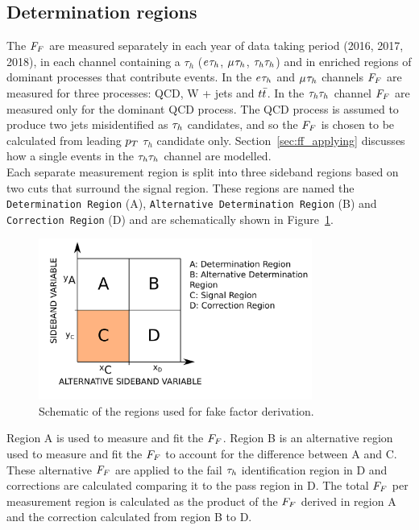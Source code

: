 \subsection{Determination regions}
\label{sec:ff_dr}

The $F_{F}$ are measured separately in each year of data taking period (2016, 2017, 2018), in each channel containing a $\tau_h$ ($e_{}\tau_{h}$, $\mu_{}\tau_{h}$, $\tau_{h}\tau_{h}$) and in enriched regions of dominant processes that contribute \jtth events.
In the $e_{}\tau_{h}$ and $\mu_{}\tau_{h}$ channels $F_{F}$ are measured for three processes: \ac{QCD}, W + jets and $t\bar{t}$.
In the $\tau_{h}\tau_{h}$ channel $F_{F}$ are measured only for the dominant \ac{QCD} process.
The \ac{QCD} process is assumed to produce two jets misidentified as $\tau_{h}$ candidates, and so the $F_{F}$ is chosen to be calculated from leading $p_{T}$ $\tau_h$ candidate only.
Section~\ref{sec:ff_applying} discusses how a single \jtth events in the $\tau_{h}\tau_{h}$ channel are modelled. \\

Each separate measurement region is split into three sideband regions based on two cuts that surround the signal region.
These regions are named the \texttt{Determination Region} (A), \texttt{Alternative Determination Region} (B) and \texttt{Correction Region} (D) and are schematically shown in Figure~\ref{fig:ff_schematic}. \\

\begin{figure}[!hbtp]
\centering
    \includegraphics[width=0.8\textwidth]{Figures/ff_diagram_v2.pdf}
\caption{Schematic of the regions used for fake factor derivation.}
\label{fig:ff_schematic}
\end{figure}

Region A is used to measure and fit the $F_{F}$.
Region B is an alternative region used to measure and fit the $F_{F}$ to account for the difference between A and C.
These alternative $F_{F}$ are applied to the fail $\tau_{h}$ identification region in D and corrections are calculated comparing it to the pass region in D.
The total $F_{F}$ per measurement region is calculated as the product of the $F_{F}$ derived in region A and the correction calculated from region B to D. \\


